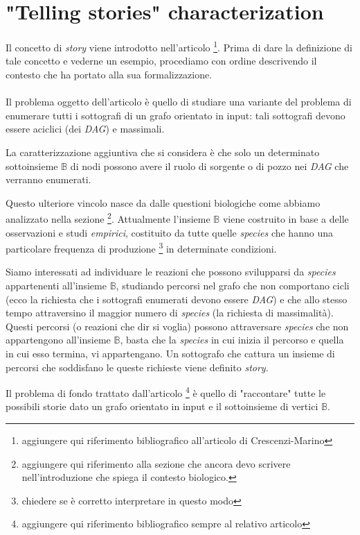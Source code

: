 \section{"Telling stories" characterization}
Il concetto di \emph{story} viene introdotto nell'articolo
\footnote{aggiungere qui riferimento bibliografico all'articolo di
  Crescenzi-Marino}. Prima di dare la definizione di tale concetto e
vederne un esempio, procediamo con ordine descrivendo il contesto che
ha portato alla sua formalizzazione.
\\\\
Il problema oggetto dell'articolo \`e quello di studiare una variante
del problema di enumerare tutti i sottografi di un grafo orientato in
input: tali sottografi devono essere aciclici (dei \emph{DAG}) e
massimali.

La caratterizzazione aggiuntiva che si considera \`e che solo un
determinato sottoinsieme $\mathbb{B}$ di nodi possono avere il ruolo
di sorgente o di pozzo nei \emph{DAG} che verranno enumerati. 

Questo ulteriore vincolo nasce da dalle questioni biologiche come
abbiamo analizzato nella sezione \footnote{aggiungere qui riferimento
  alla sezione che ancora devo scrivere nell'introduzione che spiega
  il contesto biologico.}. Attualmente l'insieme $\mathbb{B}$ viene
costruito in base a delle osservazioni e studi \emph{empirici},
costituito da tutte quelle \emph{species} che hanno una particolare
frequenza di produzione \footnote{chiedere se \`e corretto
  interpretare in questo modo} in determinate condizioni.

Siamo interessati ad individuare le reazioni che possono svilupparsi
da \emph{species} appartenenti all'insieme $\mathbb{B}$, studiando
percorsi nel grafo che non comportano cicli (ecco la richiesta che i
sottografi enumerati devono essere \emph{DAG}) e che allo stesso tempo
attraversino il maggior numero di \emph{species} (la richiesta di
massimalit\`a). Questi percorsi (o reazioni che dir si voglia) possono
attraversare \emph{species} che non appartengono all'insieme
$\mathbb{B}$, basta che la \emph{species} in cui inizia il percorso e
quella in cui esso termina, vi appartengano. Un sottografo che cattura
un insieme di percorsi che soddisfano le queste richieste viene
definito \emph{story}.

Il problema di fondo trattato dall'articolo \footnote{aggiungere qui
  riferimento bibliografico sempre al relativo articolo} \`e quello di
"raccontare" tutte le possibili storie dato un grafo orientato in
input e il sottoinsieme di vertici $\mathbb{B}$.

